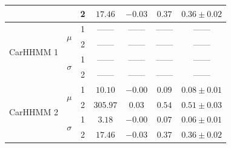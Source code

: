 \begin{table}[]
{\begin{tabular}{ccccccc}
                           &                               & 2                             & $17.46$                         & $-0.03$                     & $0.37$                             & $0.36 \pm 0.02$                             \\ \hline
\multirow{4}{*}{CarHHMM 1} & \multirow{2}{*}{$\mu$}        & 1                             & ------                         & ------                     & ------                             & ------                                      \\
                           &                               & 2                             & ------                         & ------                     & ------                             & ------                                      \\
                           & \multirow{2}{*}{$\sigma$}     & 1                             & ------                         & ------                     & ------                             & ------                                      \\
                           &                               & 2                             & ------                         & ------                     & ------                             & ------                                      \\ \hline
\multirow{4}{*}{CarHHMM 2} & \multirow{2}{*}{$\mu$}        & 1                             & $10.10$                         & $-0.00$                     & $0.09$                             & $0.08 \pm 0.01$                             \\
                           &                               & 2                             & $305.97$                         & $0.03$                     & $0.54$                             & $0.51 \pm 0.03$                             \\
                           & \multirow{2}{*}{$\sigma$}     & 1                             & $3.18$                         & $-0.00$                     & $0.07$                             & $0.06 \pm 0.01$                             \\
                           &                               & 2                             & $17.46$                         & $-0.03$                     & $0.37$                             & $0.36 \pm 0.02$                             
\end{tabular}
}
\label{table:FoVeDBA}
\end{table}

